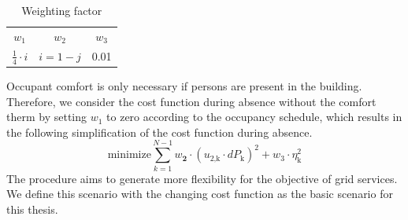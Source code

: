 \begin{table}[h]
    \centering
    \begin{tabular}{c|c|c}
         $w_\text{1}$ & $w_\text{2}$ & $w_\text{3}$ \\
        $\frac{1}{4} \cdot i$ & $i=1-j$ & 0.01
    \end{tabular}
    \caption{Weighting factor}
    \label{tab:weighting factor}
\end{table}
Occupant comfort is only necessary if persons are present in the building. Therefore, we consider the cost function during absence without the comfort therm by setting $w_\text{1}$ to zero according to the occupancy schedule, which results in the following simplification of the cost function during absence.
    \begin{equation}
        \text{minimize} \sum_{k=1}^{N-1} w_\textbf{2}\cdot(u_\text{2,k}\cdot dP_\text{k})^2 + w_\text{3} \cdot \eta_\text{k}^2
        \label{eq:costfunctionAbwesenheit}
    \end{equation}
The procedure aims to generate more flexibility for the objective of grid services. We define this scenario with the changing cost function as the basic scenario for this thesis.  %

